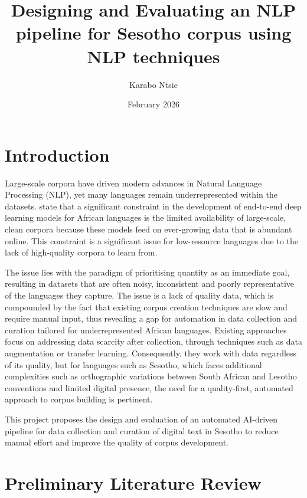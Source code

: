 \documentclass[11pt,a4paper]{article}
\begin{document}
	
\title{Designing and Evaluating an NLP pipeline for Sesotho corpus using NLP techniques }
\author{ Karabo Ntsie }
\date { February 2026}
\maketitle  


\section{Introduction}
\label{sec:intro}

Large-scale corpora have driven modern advances in Natural Language Processing (NLP),
yet many languages remain underrepresented within the datasets. \citet{Mishra2020} state that a significant constraint in the development of end-to-end deep learning models for African languages is the limited availability of large-scale, clean corpora because these models feed on ever-growing data that is abundant online. This constraint is a significant issue for low-resource languages due to the lack of high-quality corpora to learn from.

The issue lies with the paradigm of prioritising quantity as an immediate goal, resulting in datasets that are often noisy, inconsistent and poorly representative of the languages they capture. The issue is a lack of quality data, which is compounded by the fact that existing corpus creation techniques are slow and require manual input, thus revealing a gap for automation in data collection and curation tailored for underrepresented African languages. Existing approaches focus on addressing data scarcity after collection, through techniques such as data augmentation or transfer learning. Consequently, they work with data regardless of its quality, but for languages such as Sesotho, which faces additional complexities such as orthographic variations between South African and Lesotho conventions and limited digital presence, the need for a quality-first, automated approach to corpus building is pertinent.

This project proposes the design and evaluation of an automated AI-driven pipeline for data collection and curation of digital text in Sesotho to reduce manual effort and improve the quality of corpus development.


\section{Preliminary Literature Review}
\label{sec:review}
\end{document}
